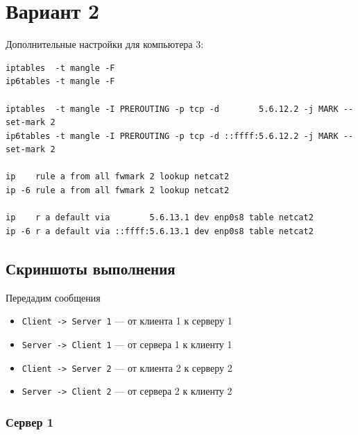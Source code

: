 \section{Вариант 2}

Дополнительные настройки для компьютера 3:

\begin{verbatim}
iptables  -t mangle -F
ip6tables -t mangle -F

iptables  -t mangle -I PREROUTING -p tcp -d        5.6.12.2 -j MARK --set-mark 2
ip6tables -t mangle -I PREROUTING -p tcp -d ::ffff:5.6.12.2 -j MARK --set-mark 2

ip    rule a from all fwmark 2 lookup netcat2
ip -6 rule a from all fwmark 2 lookup netcat2

ip    r a default via        5.6.13.1 dev enp0s8 table netcat2
ip -6 r a default via ::ffff:5.6.13.1 dev enp0s8 table netcat2
\end{verbatim}

\subsection{Скриншоты выполнения}

Передадим сообщения
\begin{itemize}
    \item \texttt{Client -> Server 1} --- от клиента 1 к серверу 1
    \item \texttt{Server -> Client 1} --- от сервера 1 к клиенту 1
    \item \texttt{Client -> Server 2} --- от клиента 2 к серверу 2
    \item \texttt{Server -> Client 2} --- от сервера 2 к клиенту 2
\end{itemize}

\subsubsection{Сервер 1}
